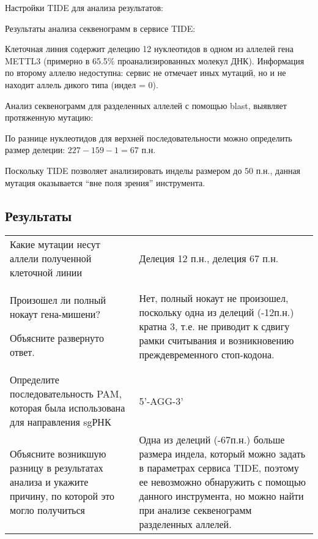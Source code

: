 \solutionSection

Настройки TIDE для анализа результатов:


Результаты анализа секвенограмм в сервисе TIDE:


Клеточная линия содержит делецию 12 нуклеотидов в одном из аллелей гена METTL3 (примерно в 65.5\% проанализированных молекул ДНК). Информация по второму аллелю недоступна: сервис не отмечает иных мутаций, но и не находит аллель дикого типа (индел = 0).

Анализ секвенограмм для разделенных аллелей с помощью blast, выявляет протяженную мутацию:


По разнице нуклеотидов для верхней последовательности можно определить размер делеции: $227-159-1=67$ п.н.

Поскольку TIDE позволяет анализировать инделы размером до $50$ п.н., данная мутация оказывается “вне поля зрения” инструмента.

\subsection*{Результаты}

\begin{tabular}{|p{6cm}|p{8cm}|}
    \hline
    Какие мутации несут аллели полученной клеточной линии & Делеция 12 п.н., делеция 67 п.н. \\
    Произошел ли полный нокаут гена-мишени? 
    
    Объясните развернуто ответ. & Нет, полный нокаут не произошел, поскольку одна из делеций (-12п.н.) кратна 3, т.е. не приводит к сдвигу рамки считывания и возникновению преждевременного стоп-кодона. \\
    \hline
    Определите последовательность PAM, которая была использована для направления sgРНК & 5’-AGG-3’ \\
    \hline
    Объясните возникшую разницу в результатах анализа и укажите причину, по которой это могло получиться & Одна из делеций (-67п.н.) больше размера индела, который можно задать в параметрах сервиса TIDE, поэтому ее невозможно обнаружить с помощью данного инструмента, но можно найти при анализе секвенограмм разделенных аллелей. \\
    \hline
\end{tabular}

\markSection

